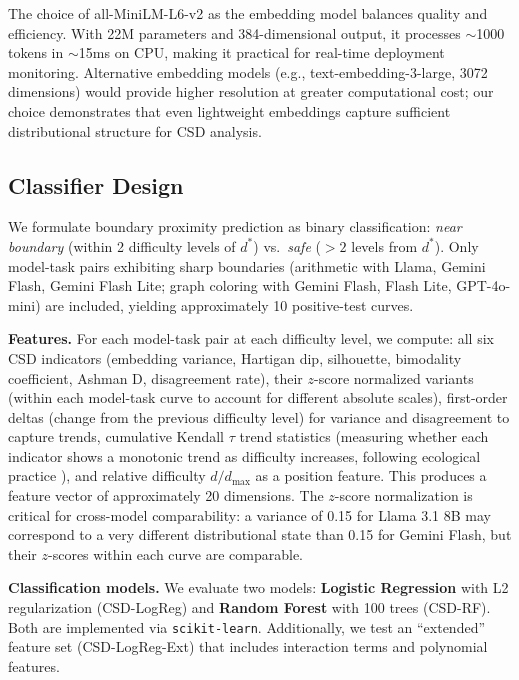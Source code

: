 \documentclass[11pt,letterpaper]{article}
\begin{document}
The choice of all-MiniLM-L6-v2 as the embedding model balances quality and efficiency. With 22M parameters and 384-dimensional output, it processes $\sim$1000 tokens in $\sim$15ms on CPU, making it practical for real-time deployment monitoring. Alternative embedding models (e.g., text-embedding-3-large, 3072 dimensions) would provide higher resolution at greater computational cost; our choice demonstrates that even lightweight embeddings capture sufficient distributional structure for CSD analysis.

\subsection{Classifier Design}

We formulate boundary proximity prediction as binary classification: \emph{near boundary} (within 2 difficulty levels of $d^*$) vs.\ \emph{safe} ($> 2$ levels from $d^*$). Only model-task pairs exhibiting sharp boundaries (arithmetic with Llama, Gemini Flash, Gemini Flash Lite; graph coloring with Gemini Flash, Flash Lite, GPT-4o-mini) are included, yielding approximately 10 positive-test curves.

\textbf{Features.} For each model-task pair at each difficulty level, we compute: all six CSD indicators (embedding variance, Hartigan dip, silhouette, bimodality coefficient, Ashman D, disagreement rate), their $z$-score normalized variants (within each model-task curve to account for different absolute scales), first-order deltas (change from the previous difficulty level) for variance and disagreement to capture trends, cumulative Kendall $\tau$ trend statistics (measuring whether each indicator shows a monotonic trend as difficulty increases, following ecological practice \cite{ghadami2022}), and relative difficulty $d/d_{\max}$ as a position feature. This produces a feature vector of approximately 20 dimensions. The $z$-score normalization is critical for cross-model comparability: a variance of 0.15 for Llama 3.1 8B may correspond to a very different distributional state than 0.15 for Gemini Flash, but their $z$-scores within each curve are comparable.

\textbf{Classification models.} We evaluate two models: \textbf{Logistic Regression} with L2 regularization (CSD-LogReg) and \textbf{Random Forest} with 100 trees (CSD-RF). Both are implemented via \texttt{scikit-learn}. Additionally, we test an ``extended'' feature set (CSD-LogReg-Ext) that includes interaction terms and polynomial features.
\end{document}
